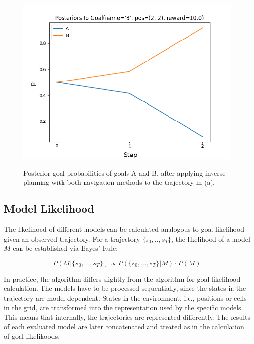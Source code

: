 \begin{figure}
{	\includegraphics[width=0.95\linewidth]{res/greedy_pos}
	}
	\caption{Posterior goal probabilities of goals A and B, after applying inverse planning with both navigation methods to the trajectory in (a).}
	\label{fig:posteriors}
\end{figure}


\subsection{Model Likelihood}

The likelihood of different models can be calculated analogous to goal likelihood given an observed trajectory.
For a trajectory $\{s_0,..,s_T\}$, the likelihood of a model $M$ can be established via Bayes' Rule:

\begin{equation}
	P(M | \{s_0, ..., s_T\}) \propto P(\{s_0, ..., s_T\} | M) \cdot P(M)
\end{equation}

In practice, the algorithm differs slightly from the algorithm for goal likelihood calculation.
The models have to be processed sequentially, since the states in the trajectory are model-dependent. States in the environment, i.e., positions or cells in the grid, are transformed into the representation used by the specific models.
This means that internally, the trajectories are represented differently.
The results of each evaluated model are later concatenated and treated as in the calculation of goal likelihoods.
